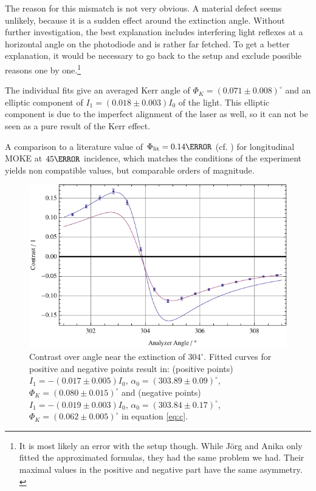 \documentclass[a4paper]{scrartcl}
\numberwithin{equation}{section}
\numberwithin{figure}{section}
\numberwithin{table}{section}
\begin{document}
The reason for this mismatch is not very obvious. A material defect seems unlikely, because it is a sudden effect around the extinction angle. Without further investigation, the best explanation includes interfering light reflexes at a horizontal angle on the photodiode and is rather far fetched. To get a better explanation, it would be necessary to go back to the setup and exclude possible reasons one by one.\footnote{It is most likely an error with the setup though. While J\"org and Anika only fitted the approximated formulas, they had the same problem we had. Their maximal values in the positive and negative part have the same asymmetry. \cite{jrganika}}

The individual fits give an averaged Kerr angle of $\Phi_K = (0.071\pm0.008)^\circ$ and an elliptic component of $I_1=(0.018\pm0.003)I_0$ of the light. This elliptic component is due to the imperfect alignment of the laser as well, so it can not be seen as a pure result of the Kerr effect.

A comparison to a literature value of $\Phi_\text{lit}=0.14 \degree$ (cf. \cite{stanford}) for longitudinal MOKE at $45\degree$ incidence, which matches the conditions of the experiment yields non compatible values, but comparable orders of magnitude.

\begin{figure} 
 \centering
         \includegraphics[width=0.45\linewidth]{img/kerr.pdf}
\caption{
\small Contrast over angle near the extinction of $304^\circ$. Fitted curves for positive and negative points result in: (positive points) $I_1 = -(0.017\pm0.005)I_0$, $\alpha_0=(303.89\pm 0.09)^\circ$, $\Phi_K=(0.080\pm0.015)^\circ$ and (negative points) $I_1 = -(0.019\pm0.003)I_0$, $\alpha_0=(303.84\pm 0.17)^\circ$, $\Phi_K=(0.062\pm0.005)^\circ$ in equation \ref{eq:c}. } 
	\label{fig:kerrangle}
\end{figure}
\end{document}
